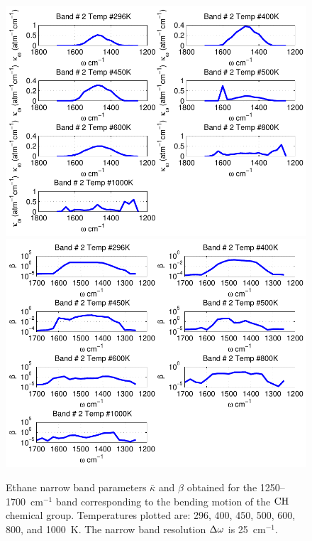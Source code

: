 \begin{figure}[p]
\begin{center}
\includegraphics[width=5.0in]{Figures/Ethane_Kappa_Band2_MALKMUS.pdf}
\includegraphics[width=5.0in]{Figures/Ethane_Beta_Band2_MALKMUS.pdf}
\end{center}
\caption{Ethane narrow band parameters $\bar{\kappa}$ and $\beta$ obtained for the 1250--1700~cm$^{-1}$ band corresponding to the bending motion of the $\rm CH$ chemical group. Temperatures plotted are: 296, 400, 450, 500, 600, 800, and 1000~K. The narrow band resolution $\Delta \omega$ is 25~cm$^{-1}$.\label{fig:ethane_kappa_beta2}}
\end{figure}

